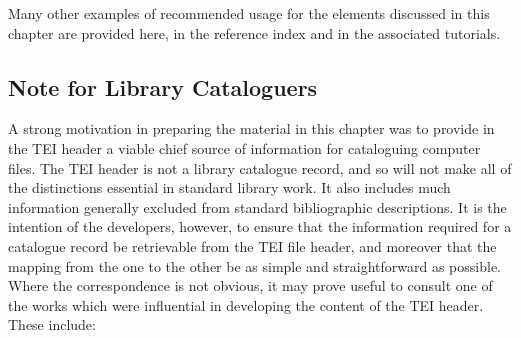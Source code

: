 Many other examples of recommended usage for the elements discussed in this chapter are provided here, in the reference index and in the associated tutorials. 
\subsection[{Note for Library Cataloguers}]{Note for Library Cataloguers}\label{HD8}\par
A strong motivation in preparing the material in this chapter was to provide in the TEI header a viable chief source of information for cataloguing computer files. The TEI header is not a library catalogue record, and so will not make all of the distinctions essential in standard library work. It also includes much information generally excluded from standard bibliographic descriptions. It is the intention of the developers, however, to ensure that the information required for a catalogue record be retrievable from the TEI file header, and moreover that the mapping from the one to the other be as simple and straightforward as possible. Where the correspondence is not obvious, it may prove useful to consult one of the works which were influential in developing the content of the TEI header. These include:\begin{description}


\end{description}
